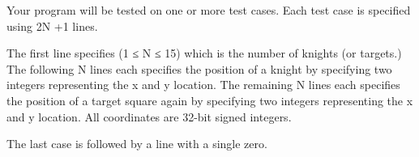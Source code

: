 Your program will be tested on one or more test cases. Each test case is specified using 2N +1 lines.


The first line specifies (1 ≤ N ≤ 15) which is the number of knights (or targets.) The following N lines each specifies the position of a knight by specifying two integers representing the x and y location. The remaining N lines each specifies the position of a target square again by specifying two integers representing the x and y location. All coordinates are 32-bit signed integers.


The last case is followed by a line with a single zero.